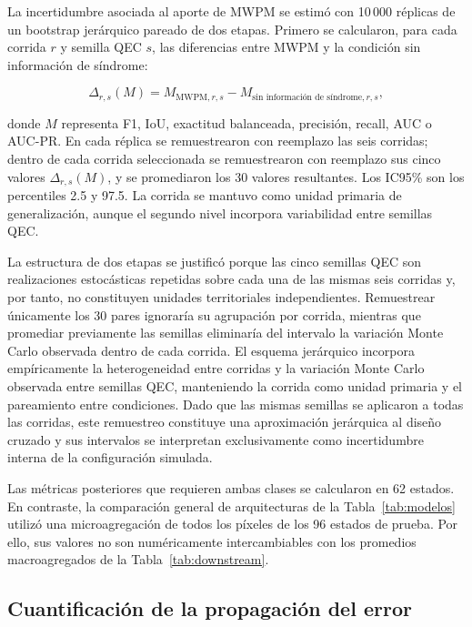 \documentclass[fleqn,10pt]{wlscirep}
\begin{document}
La incertidumbre asociada al aporte de MWPM se estimó con 10\,000
réplicas de un bootstrap jerárquico pareado de dos etapas. Primero se
calcularon, para cada corrida $r$ y semilla QEC $s$, las diferencias
entre MWPM y la condición sin información de síndrome:

\begin{equation}
\Delta_{r,s}(M)=M_{\mathrm{MWPM},r,s}-M_{\text{sin información de síndrome},r,s},
\label{eq:delta_bootstrap}
\end{equation}

donde $M$ representa F1, IoU, exactitud balanceada, precisión, recall,
AUC o AUC-PR. En cada réplica se remuestrearon con reemplazo las seis
corridas; dentro de cada corrida seleccionada se remuestrearon con
reemplazo sus cinco valores $\Delta_{r,s}(M)$, y se promediaron los 30
valores resultantes. Los IC95\% son los percentiles 2.5 y 97.5. La
corrida se mantuvo como unidad primaria de generalización, aunque el
segundo nivel incorpora variabilidad entre semillas QEC.

La estructura de dos etapas se justificó porque las cinco semillas QEC
son realizaciones estocásticas repetidas sobre cada una de las mismas
seis corridas y, por tanto, no constituyen unidades territoriales
independientes. Remuestrear únicamente los 30 pares ignoraría su
agrupación por corrida, mientras que promediar previamente las semillas
eliminaría del intervalo la variación Monte Carlo observada dentro de
cada corrida. El esquema jerárquico incorpora empíricamente la heterogeneidad entre corridas y la variación Monte Carlo observada entre semillas QEC, manteniendo la corrida como unidad primaria y el pareamiento entre condiciones. Dado que las mismas semillas se aplicaron a todas las corridas, este remuestreo constituye una aproximación jerárquica al diseño cruzado y sus intervalos se interpretan exclusivamente como incertidumbre interna de la configuración simulada.

Las métricas posteriores que requieren ambas clases se calcularon en 62 estados. En contraste, la comparación general de arquitecturas de la
Tabla~\ref{tab:modelos} utilizó una microagregación de todos los píxeles
de los 96 estados de prueba. Por ello, sus valores no son numéricamente
intercambiables con los promedios macroagregados de la
Tabla~\ref{tab:downstream}.

\subsection*{Cuantificación de la propagación del error}
\end{document}
